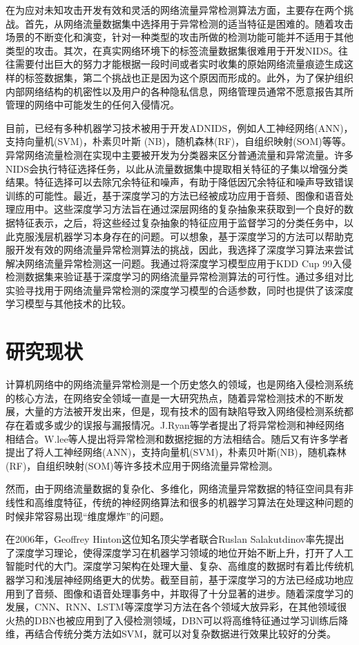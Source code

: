 在为应对未知攻击开发有效和灵活的网络流量异常检测算法方面，主要存在两个挑战。首先，从网络流量数据集中选择用于异常检测的适当特征是困难的。随着攻击场景的不断变化和演变，针对一种类型的攻击所做的检测功能可能并不适用于其他类型的攻击。其次，在真实网络环境下的标签流量数据集很难用于开发NIDS。往往需要付出巨大的努力才能根据一段时间或者实时收集的原始网络流量痕迹生成这样的标签数据集，第二个挑战也正是因为这个原因而形成的。此外，为了保护组织内部网络结构的机密性以及用户的各种隐私信息，网络管理员通常不愿意报告其所管理的网络中可能发生的任何入侵情况。

目前，已经有多种机器学习技术被用于开发ADNIDS，例如人工神经网络(ANN)，支持向量机(SVM)，朴素贝叶斯 (NB)，随机森林(RF)，自组织映射(SOM)等等。异常网络流量检测在实现中主要被开发为分类器来区分普通流量和异常流量。许多NIDS会执行特征选择任务，以此从流量数据集中提取相关特征的子集以增强分类结果。特征选择可以去除冗余特征和噪声，有助于降低因冗余特征和噪声导致错误训练的可能性。最近，基于深度学习的方法已经被成功应用于音频、图像和语音处理应用中。这些深度学习方法旨在通过深层网络的复杂抽象来获取到一个良好的数据特征表示，之后，将这些经过复杂抽象的特征应用于监督学习的分类任务中，以此克服浅层机器学习本身存在的问题。可以想象，基于深度学习的方法可以帮助克服开发有效的网络流量异常检测算法的挑战，因此，我选择了深度学习算法来尝试解决网络流量异常检测这一问题。我通过将深度学习模型应用于KDD Cup 99入侵检测数据集来验证基于深度学习的网络流量异常检测算法的可行性。通过多组对比实验寻找用于网络流量异常检测的深度学习模型的合适参数，同时也提供了该深度学习模型与其他技术的比较。

\section{研究现状}

计算机网络中的网络流量异常检测是一个历史悠久的领域，也是网络入侵检测系统的核心方法，在网络安全领域一直是一大研究热点，随着异常检测技术的不断发展，大量的方法被开发出来，但是，现有技术的固有缺陷导致入网络侵检测系统都存在着或多或少的误报与漏报情况。J.Ryan等学者提出了将异常检测和神经网络相结合。W.lee等人提出将异常检测和数据挖掘的方法相结合。随后又有许多学者提出了将人工神经网络(ANN)，支持向量机(SVM)，朴素贝叶斯(NB)，随机森林(RF)，自组织映射(SOM)等许多技术应用于网络流量异常检测。

然而，由于网络流量数据的复杂化、多维化，网络流量异常数据的特征空间具有非线性和高维度特征，传统的神经网络算法和很多的机器学习算法在处理这种问题的时候非常容易出现“维度爆炸”的问题。

在2006年，Geoffrey Hinton这位知名顶尖学者联合Ruslan Salakutdinov率先提出了深度学习理论，使得深度学习在机器学习领域的地位开始不断上升，打开了人工智能时代的大门。深度学习架构在处理大量、复杂、高维度的数据时有着比传统机器学习和浅层神经网络更大的优势。截至目前，基于深度学习的方法已经成功地应用到了音频、图像和语音处理事务中，并取得了十分显著的进步。随着深度学习的发展，CNN、RNN、LSTM等深度学习方法在各个领域大放异彩，在其他领域很火热的DBN也被应用到了入侵检测领域，DBN可以将高维特征通过学习训练后降维，再结合传统分类方法如SVM，就可以对复杂数据进行效果比较好的分类。

